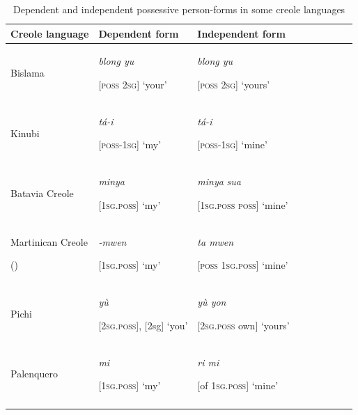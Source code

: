 \documentclass[output=paper]{langsci/langscibook}
\begin{document}
\begin{table}
\begin{tabularx}{\textwidth}{XXX}
\lsptoprule

\bfseries Creole language & \bfseries Dependent form & \bfseries Independent form\\
\midrule
Bislama

\citep{Meyerhoff2013} & \textit{blong yu}{\textit{~}}

[\textsc{poss} \textsc{2sg}] ‘your’ & \textit{blong yu}{\textit{~}} {\textit{~ ~ ~ ~ ~ ~ ~ ~ ~ ~ ~ ~ ~}}

[\textsc{poss} \textsc{2sg}] { ‘}yours’\\

\tablevspace
Kinubi

\citep{Luffin2013} & \textit{tá-i}

[\textsc{poss-1sg}] ‘my’ & \textit{tá-i}

[\textsc{poss-1sg}] ‘mine’\\

\tablevspace
Batavia Creole 

\citep{Maurer2013} & \textit{minya} 

[\textsc{1sg.poss}] ‘my’ & \textit{minya}\textbf{ }\textit{sua}\textbf{ }

[\textsc{1sg.poss} \textsc{poss}] ‘mine’\\

\tablevspace
Martinican Creole

(\citealt{ColotLudwig2013}) & \textit{{}-mwen}

[\textsc{1sg.poss}] ‘my’ & \textit{ta mwen}

[\textsc{poss} \textsc{1sg.poss}] ‘mine’\\

\tablevspace
Pichi

\citep{Yakpo2013} & \textit{yù} {\textit{~}}

[\textsc{2sg.poss}], [2sg] ‘you’ & \textit{yù yon}

[\textsc{2sg.poss} own] ‘yours’\\

\tablevspace
Palenquero

\citep{Schwegler2013} & \textit{mi}

[\textsc{1sg.poss}] ‘my’ & \textit{ri mi}

[of \textsc{1sg.poss}] ‘mine’\\
\lspbottomrule
\end{tabularx}

\caption{Dependent and independent possessive person-forms in some creole languages}
\label{tab:michaelis:4}
\end{table}
\end{document}
